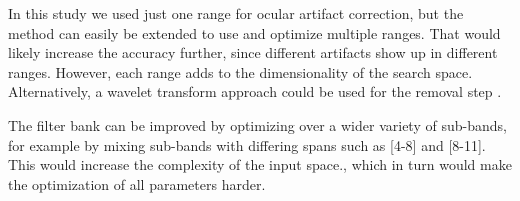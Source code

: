 In this study we used just one range for ocular artifact correction, but the method can easily be extended to use and optimize multiple ranges. That would likely increase the accuracy further, since different artifacts show up in different ranges. However, each range adds to the dimensionality of the search space. Alternatively, a wavelet transform approach could be used for the removal step \citep{krishnaveni2006automatic}.

The filter bank can be improved by optimizing over a wider variety of sub-bands, for example by mixing sub-bands with differing spans such as [4-8] and [8-11]. This would increase the complexity of the input space., which in turn would make the optimization of all parameters harder. 